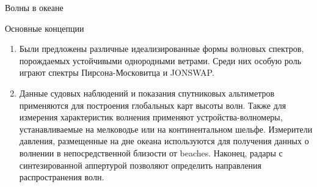 \begin{chapter}{Волны в океане}
\begin{section}{Основные концепции}
\begin{enumerate}
\item 
Были предложены различные идеализированные формы волновых спектров, 
порождаемых устойчивыми однородными ветрами. Среди них особую роль
играют спектры Пирсона-Московитца и JONSWAP.
%

\item 
Данные судовых наблюдений и показания спутниковых альтиметров применяются
для построения глобальных карт высоты волн. Также для измерения характеристик
волнения применяют устройства-волно\-меры, устанавливаемые на мелководье или
на континентальном шельфе. Измерители давления, размещенные на дне океана
используются для получения данных о волнении в непосредственной близости от
beaches. Наконец, радары с синтезированной аппертурой позволяют определить 
направления распространения волн.
%
\end{enumerate}
\end{section}
\end{chapter}